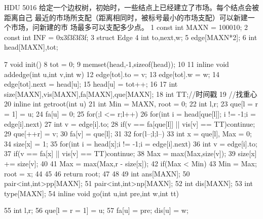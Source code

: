 \documentclass[11pt]{article}
\begin{document}
\begin{Code}
     HDU 5016 给定一个边权树，初始时，一些结点上已经建立了市场。每个结点会被距离自己
     最近的市场所支配（距离相同时，被标号最小的市场支配）可以新建一个市场，问新建的市
     场最多可以支配多少点。
 1   const int MAXN = 100010;
 2   const int INF = 0x3f3f3f3f;
 3   struct Edge{
 4       int to,next,w;
 5   }edge[MAXN*2];
 6   int head[MAXN],tot;


 7   void init(){
 8       tot = 0;
 9       memset(head,-1,sizeof(head));
10   }
11   inline void addedge(int u,int v,int w){
12       edge[tot].to = v;
13       edge[tot].w = w;
14       edge[tot].next = head[u];
15       head[u] = tot++;
16   }
17   int size[MAXN],vis[MAXN],fa[MAXN],que[MAXN];
18   int TT;//时间戳
19   //找重心
20   inline int getroot(int u){
21       int Min = MAXN, root = 0;
22       int l,r;
23       que[l = r = 1] = u;
24       fa[u] = 0;
25       for(;l <= r;l++)
26           for(int i = head[que[l]]; i != -1;i = edge[i].next){
27                int v = edge[i].to;
28                if(v == fa[que[l]] || vis[v] == TT)continue;
29                que[++r] = v;
30                fa[v] = que[l];
31           }
32       for(l--;l;l--){
33           int x = que[l], Max = 0;
34           size[x] = 1;
35           for(int i = head[x];i != -1;i = edge[i].next){
36                int v = edge[i].to;
37                if(v == fa[x] || vis[v] == TT)continue;
38                Max = max(Max,size[v]);
39                size[x] += size[v];
40           }
41           Max = max(Max,r - size[x]);
42           if(Max < Min){
43                Min = Max; root = x;
44           }
45       }
46       return root;
47   }
48
49   int ans[MAXN];
50   pair<int,int>pp[MAXN];
51   pair<int,int>np[MAXN];
52   int dis[MAXN];
53   int type[MAXN];
54   inline void go(int u,int pre,int w,int tt){
55       int l,r;
56       que[l = r = 1] = u;
57       fa[u] = pre; dis[u] = w;


}
\end{Code}
\end{document}
